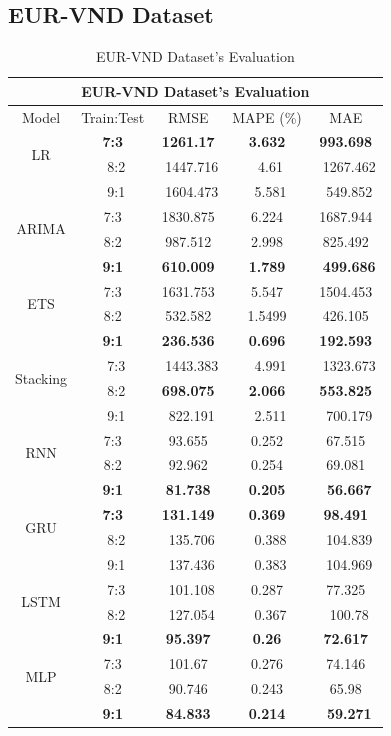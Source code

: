 \documentclass{ieeeojies}
\begin{document}
\subsection{EUR-VND Dataset} 
\begin{table}[H]
    \centering
    \begin{tabular}{|c|c|c|c|c|}
         \hline
         \multicolumn{5}{|c|}{\textbf{EUR-VND Dataset's Evaluation}}\\
         \hline
         \centering Model & Train:Test & RMSE & MAPE (\%) & MAE\\
         \hline
         \multirow{2}{*}{LR} &\textbf{7:3} &\textbf{1261.17} &\textbf{3.632} &\textbf{993.698} \\ &\ 8:2 &\ 1447.716 &\ 4.61 &\ 1267.462 \\&\ 9:1 &\ 1604.473 &\ 5.581 &\ 549.852 \\
         \hline
         \multirow{2}{*}{ARIMA} & 7:3 & 1830.875 & 6.224 & 1687.944 \\ & 8:2 & 987.512 & 2.998 & 825.492 \\ & \textbf{9:1} & \textbf{610.009} & \textbf{1.789} &\ \textbf{499.686} \\
         \hline
         \multirow{2}{*}{ETS} & 7:3 & 1631.753 & 5.547 & 1504.453 \\ & 8:2 & 532.582&1.5499&426.105 \\& \textbf{9:1} & \textbf{236.536} & \textbf{0.696} & \textbf{192.593} \\
         \hline
         \multirow{2}{*}{Stacking} &\ 7:3 &\ 1443.383 &\ 4.991 &\ 1323.673 \\ &\ 8:2 &\textbf{698.075} &\textbf{2.066} &\textbf{553.825}\\&\ 9:1 &\ 822.191 &\ 2.511 &\ 700.179 \\
         \hline
         \multirow{2}{*}{RNN} & 7:3 & 93.655 & 0.252 & 67.515 \\ & 8:2 & 92.962 & 0.254 & 69.081 \\ & \textbf{9:1} & \textbf{81.738} & \textbf{0.205} &\ \textbf{56.667} \\
         \hline
         \multirow{2}{*}{GRU} &\textbf{7:3} &\textbf{131.149}&\textbf{0.369}&\textbf{98.491} \\ &\ 8:2 &\ 135.706&\ 0.388 &\ 104.839 \\&\ 9:1 &\ 137.436 &\ 0.383 &\ 104.969 \\
         \hline
         \multirow{2}{*}{LSTM} &\ 7:3 &\ 101.108 &0.287 &77.325\\ &\ 8:2 &\ 127.054&\ 0.367 &\ 100.78 \\&\textbf{9:1}&\textbf{95.397} &\textbf{0.26} &\textbf{72.617} \\
         \hline
         \multirow{2}{*}{MLP} & 7:3 & 101.67 & 0.276 & 74.146 \\ & 8:2 & 90.746 & 0.243 & 65.98 \\ & \textbf{9:1} & \textbf{84.833} & \textbf{0.214} &\ \textbf{59.271} \\
         \hline
    \end{tabular}
    \caption{EUR-VND Dataset's Evaluation}
    \label{vcbresult}
\end{table}
\end{document}
